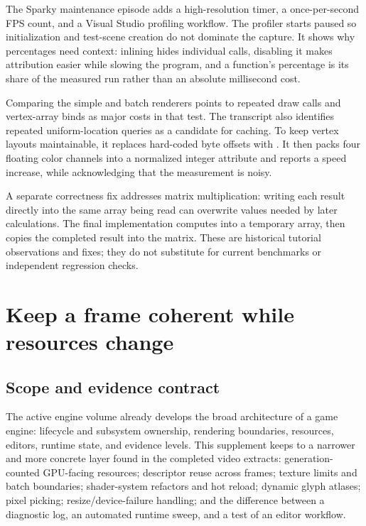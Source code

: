 \hypertarget{06-engine-ii-ch041-measure-before-tuning-and-make-layout-changes-explicit}{}

The Sparky maintenance episode adds a high-resolution timer, a once-per-second FPS count, and a Visual Studio profiling workflow. The profiler starts paused so initialization and test-scene creation do not dominate the capture. It shows why percentages need context: inlining hides individual calls, disabling it makes attribution easier while slowing the program, and a function's percentage is its share of the measured run rather than an absolute millisecond cost.

Comparing the simple and batch renderers points to repeated draw calls and vertex-array binds as major costs in that test. The transcript also identifies repeated uniform-location queries as a candidate for caching. To keep vertex layouts maintainable, it replaces hard-coded byte offsets with . It then packs four floating color channels into a normalized integer attribute and reports a speed increase, while acknowledging that the measurement is noisy.

A separate correctness fix addresses matrix multiplication: writing each result directly into the same array being read can overwrite values needed by later calculations. The final implementation computes into a temporary array, then copies the completed result into the matrix. These are historical tutorial observations and fixes; they do not substitute for current benchmarks or independent regression checks.

\section{Keep a frame coherent while resources change}\label{06-engine-ii-ch041-keep-a-frame-coherent-while-resources-change}

\hypertarget{06-engine-ii-ch041-keep-a-frame-coherent-while-resources-change}{}

\subsection{Scope and evidence contract}\label{06-engine-ii-ch041-scope-and-evidence-contract}

\hypertarget{06-engine-ii-ch041-scope-and-evidence-contract}{}

The active engine volume already develops the broad architecture of a game engine: lifecycle and subsystem ownership, rendering boundaries, resources, editors, runtime state, and evidence levels. This supplement keeps to a narrower and more concrete layer found in the completed video extracts: generation-counted GPU-facing resources; descriptor reuse across frames; texture limits and batch boundaries; shader-system refactors and hot reload; dynamic glyph atlases; pixel picking; resize/device-failure handling; and the difference between a diagnostic log, an automated runtime sweep, and a test of an editor workflow.

